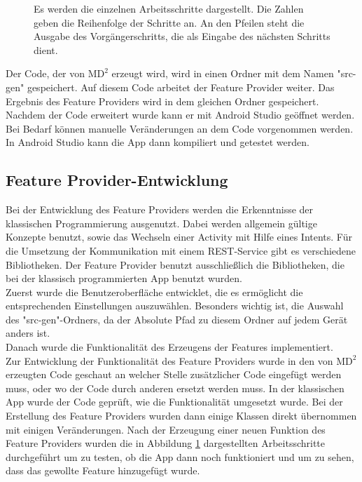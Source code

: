 \documentclass[a4paper,twoside]{article}
\begin{document}
	\begin{figure}[!h]
		\centering
		{}
		\caption{Es werden die einzelnen Arbeitsschritte dargestellt. Die Zahlen geben die Reihenfolge der Schritte an. An den Pfeilen steht die Ausgabe des Vorg\"angerschritts, die als Eingabe des n\"achsten Schritts dient.}
		\label{fig:Arbeitsschritte}
	\end{figure}
	
	\noindent Der Code, der von $\text{MD}^2$ erzeugt wird, wird in einen Ordner mit dem Namen "src-gen" gespeichert. Auf diesem Code arbeitet der Feature Provider weiter. Das Ergebnis des Feature Providers wird in dem gleichen Ordner gespeichert. Nachdem der Code erweitert wurde kann er mit Android Studio ge\"offnet werden. Bei Bedarf k\"onnen manuelle Ver\"anderungen an dem Code vorgenommen werden. In Android Studio kann die App dann kompiliert und getestet werden.
	
	\subsection{Feature Provider-Entwicklung}
	Bei der Entwicklung des Feature Providers werden die Erkenntnisse der klassischen Programmierung ausgenutzt. Dabei werden allgemein g\"ultige Konzepte benutzt, sowie das Wechseln einer Activity mit Hilfe eines Intents. F\"ur die Umsetzung der Kommunikation mit einem REST-Service gibt es verschiedene Bibliotheken. Der Feature Provider benutzt ausschlie\ss{}lich die Bibliotheken, die bei der klassisch programmierten App benutzt wurden.\\
	Zuerst wurde die Benutzeroberfl\"ache entwicklet, die es erm\"oglicht die entsprechenden Einstellungen auszuw\"ahlen. Besonders wichtig ist, die Auswahl des "src-gen"-Ordners, da der Absolute Pfad zu diesem Ordner auf jedem Ger\"at anders ist.\\
	Danach wurde die Funktionalit\"at des Erzeugens der Features implementiert.\\
	Zur Entwicklung der Funktionalit\"at des Feature Providers wurde in den von $\text{MD}^2$ erzeugten Code geschaut an welcher Stelle zus\"atzlicher Code eingef\"ugt werden muss, oder wo der Code durch anderen ersetzt werden muss. In der klassischen App wurde der Code gepr\"uft, wie die Funktionalit\"at umgesetzt wurde. Bei der Erstellung des Feature Providers wurden dann einige Klassen direkt \"ubernommen mit einigen Ver\"anderungen. Nach der Erzeugung einer neuen Funktion des Feature Providers wurden die in Abbildung \ref{fig:Arbeitsschritte} dargestellten Arbeitsschritte durchgef\"uhrt um zu testen, ob die App dann noch funktioniert und um zu sehen, dass das gewollte Feature hinzugef\"ugt wurde.
	
\end{document}
